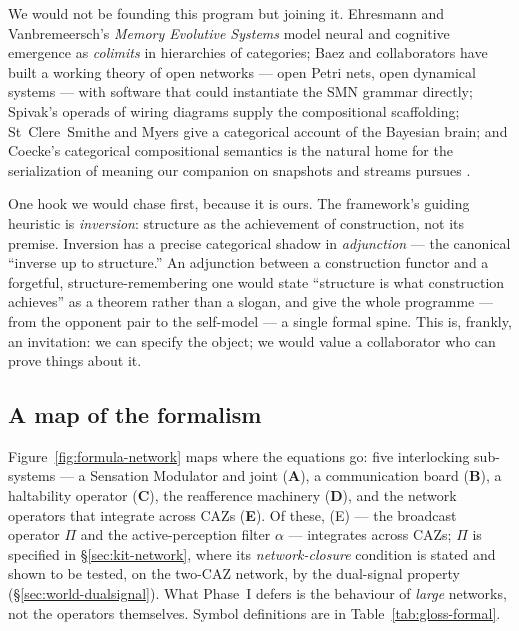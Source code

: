 \documentclass{article}
\begin{document}
We would not be founding this program but joining it.  Ehresmann and Vanbremeersch's
\emph{Memory Evolutive Systems} \citep{EhresmannVanbremeersch2007} model neural and
cognitive emergence as \emph{colimits} in hierarchies of categories; Baez and
collaborators have built a working theory of open networks --- open Petri nets, open
dynamical systems \citep{BaezMaster2020OpenPetri} --- with software
\citep[AlgebraicJulia;][]{Patterson2022Catlab} that could instantiate the SMN grammar
directly; Spivak's operads of wiring diagrams \citep{Spivak2013WiringDiagrams} supply
the compositional scaffolding; St~Clere~Smithe and Myers
\citep{StClereSmithe2023,Myers2022CategoricalSystems} give a categorical account of
the Bayesian brain; and Coecke's categorical compositional semantics
\citep{Coecke2010CompositionalMeaning} is the natural home for the serialization of
meaning our companion on snapshots and streams pursues
\citep{Nagarjuna2026SnapshotsStreams}.

One hook we would chase first, because it is ours.  The framework's guiding heuristic
is \emph{inversion}: structure as the achievement of construction, not its premise.
Inversion has a precise categorical shadow in \emph{adjunction} --- the canonical
``inverse up to structure.''  An adjunction between a construction functor and a
forgetful, structure-remembering one would state ``structure is what construction
achieves'' as a theorem rather than a slogan, and give the whole programme --- from
the opponent pair to the self-model --- a single formal spine.  This is, frankly, an
invitation: we can specify the object; we would value a collaborator who can prove
things about it.

\subsection{A map of the formalism}\label{app:formalism-map}

Figure~\ref{fig:formula-network} maps where the equations go: five
interlocking sub-systems --- a Sensation Modulator and joint
(\textbf{A}), a communication board (\textbf{B}), a haltability operator
(\textbf{C}), the reafference machinery (\textbf{D}), and the network
operators that integrate across CAZs (\textbf{E}).  Of these, (E) --- the
broadcast operator $\Pi$ and the active-perception filter $\alpha$ ---
integrates across CAZs; $\Pi$ is specified in \S\ref{sec:kit-network}, where
its \emph{network-closure} condition is stated and shown to be tested, on the
two-CAZ network, by the dual-signal property (\S\ref{sec:world-dualsignal}).
What Phase~I defers is the behaviour of \emph{large} networks, not the
operators themselves.  Symbol definitions are in
Table~\ref{tab:gloss-formal}.
\end{document}
